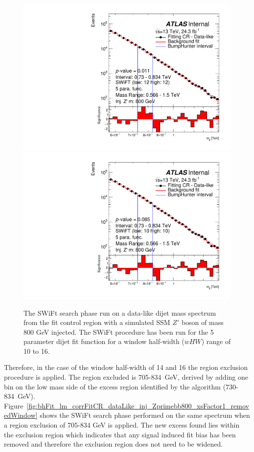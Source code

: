 \begin{figure}[!htb]
{  \includegraphics[width=0.45\linewidth, angle=0]{figs/Dibjet/LowMass/FitStudy_min566/bhFit_corrFitCR_dataLike_5para_low12_high12_inj_Zprimebb800_xsFactor1.pdf}
}
 {
  \includegraphics[width=0.45\linewidth, angle=0]{figs/Dibjet/LowMass/FitStudy_min566/bhFit_corrFitCR_dataLike_5para_low10_high10_inj_Zprimebb800_xsFactor1.pdf}
}
\vspace{-0.3em}
\caption[The SWiFt search phase run on a data-like dijet mass spectrum
          from the fit control region with a simulated SSM $Z'$ boson of mass 800 GeV injected.]
        {\label{fig:bhFit_lm_corrFitCR_dataLike_inj_Zprimebb800_xsFactor1}
          The SWiFt search phase run on a data-like dijet mass spectrum
          from the fit control region with a simulated SSM $Z'$ boson of mass 800 GeV injected.
          The SWiFt procedure has been run for the 5 parameter dijet fit function for a window half-width ($wHW$) range of 10 to 16.
}
\vspace{-0.7em}
\end{figure}

Therefore, in the case of the window half-width of 14 and 16 the region exclusion procedure is applied.
The region excluded is 705-834~GeV, derived by adding one bin on the low mass side of the excess region identified by the \bh{} algorithm (730-834~GeV).
Figure~\ref{fig:bhFit_lm_corrFitCR_dataLike_inj_Zprimebb800_xsFactor1_removedWindow} shows the SWiFt search phase
performed on the same spectrum when a region exclusion of 705-834 GeV is applied.
The new excess found lies within the exclusion region which indicates that any signal induced fit bias has been removed
and therefore the exclusion region does not need to be widened.

